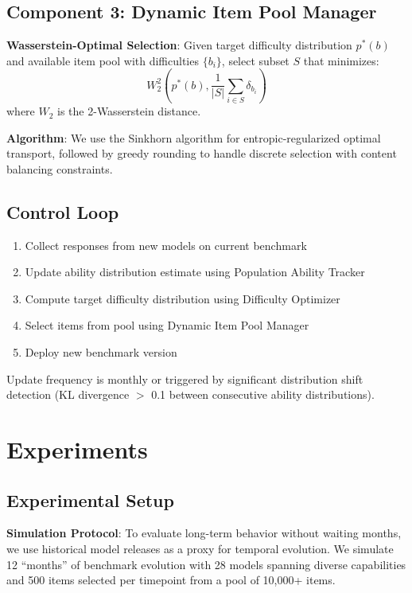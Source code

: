 \documentclass{article}
\begin{document}
\subsection{Component 3: Dynamic Item Pool Manager}

\textbf{Wasserstein-Optimal Selection}: Given target difficulty distribution $p^*(b)$ and available item pool with difficulties $\{b_i\}$, select subset $S$ that minimizes:
\begin{equation}
W_2^2\left(p^*(b), \frac{1}{|S|}\sum_{i \in S} \delta_{b_i}\right)
\end{equation}
where $W_2$ is the 2-Wasserstein distance.

\textbf{Algorithm}: We use the Sinkhorn algorithm for entropic-regularized optimal transport, followed by greedy rounding to handle discrete selection with content balancing constraints.

\subsection{Control Loop}

\begin{enumerate}
    \item Collect responses from new models on current benchmark
    \item Update ability distribution estimate using Population Ability Tracker
    \item Compute target difficulty distribution using Difficulty Optimizer
    \item Select items from pool using Dynamic Item Pool Manager
    \item Deploy new benchmark version
\end{enumerate}

Update frequency is monthly or triggered by significant distribution shift detection (KL divergence $>$ 0.1 between consecutive ability distributions).

\section{Experiments}
\label{sec:experiments}

\subsection{Experimental Setup}

\textbf{Simulation Protocol}: To evaluate long-term behavior without waiting months, we use historical model releases as a proxy for temporal evolution. We simulate 12 ``months'' of benchmark evolution with 28 models spanning diverse capabilities and 500 items selected per timepoint from a pool of 10,000+ items.
\end{document}
